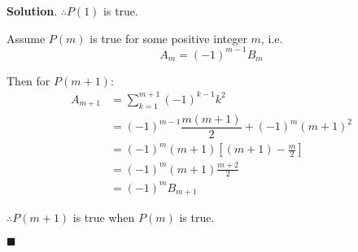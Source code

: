 \documentclass[12pt]{article}
\newenvironment*{sol}{\par \textbf{Solution}.}{\hfill$\blacksquare$}
\begin{document}
\begin{enumerate}
\begin{enumerate}
\begin{sol}
                $\therefore P(1)$ is true.
                
                Assume $P(m)$ is true for some positive integer $m$, i.e. $$A_m=(-1)^{m-1}B_m$$
        
                Then for $P(m+1)$:\begin{align*}
                    A_{m+1}&=\sum_{k=1}^{m+1}(-1)^{k-1}k^2\\
                    &=(-1)^{m-1}\dfrac{m(m+1)}{2}+(-1)^m(m+1)^2\\
                    &=(-1)^m(m+1)[(m+1)-\frac{m}{2}]\\
                    &=(-1)^m(m+1)\frac{m+2}{2}\\
                    &=(-1)^m B_{m+1}
                \end{align*}
        
                $\therefore P(m+1)$ is true when $P(m)$ is true.
        

\end{sol}
\end{enumerate}
\end{enumerate}
\end{document}
